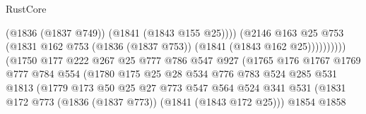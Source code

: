 \begin{lexlean}{RustCore}
\begin{coremodule}
                                                (@1836 (@1837 @749))
                                                (@1841 (@1843 @155 @25))))
                                            (@2146
                                              @163
                                              @25
                                              @753
                                              (@1831
                                                @162
                                                @753
                                                (@1836 (@1837 @753))
                                                (@1841 (@1843 @162 @25))))))))))
                                (@1750
                                  @177
                                  @222
                                  @267
                                  @25
                                  @777
                                  @786
                                  @547
                                  @927
                                  (@1765
                                    @176
                                    @1767
                                    @1769
                                    @777
                                    @784
                                    @554
                                    (@1780
                                      @175
                                      @25
                                      @28
                                      @534
                                      @776
                                      @783
                                      @524
                                      @285
                                      @531
                                      @1813
                                      (@1779
                                        @173
                                        @50
                                        @25
                                        @27
                                        @773
                                        @547
                                        @564
                                        @524
                                        @341
                                        @531
                                        (@1831
                                          @172
                                          @773
                                          (@1836 (@1837 @773))
                                          (@1841 (@1843 @172 @25)))
                                        @1854
                                        @1858

\end{coremodule}
\end{lexlean}
